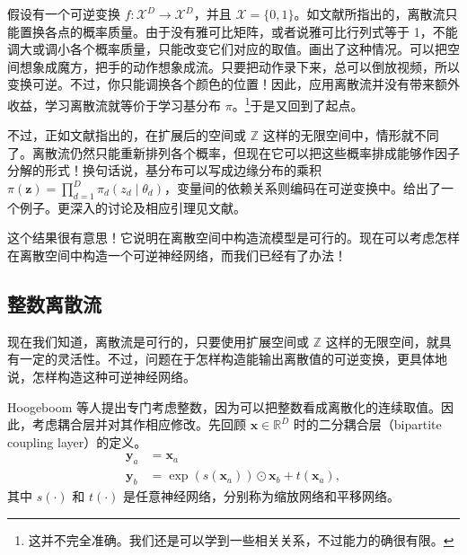 假设有一个可逆变换 $f\colon\mathcal{X}^D\to\mathcal{X}^D$，并且 $\mathcal{X}=\{0,1\}$。如文献所指出的，离散流只能置换各点的概率质量。由于没有雅可比矩阵，或者说雅可比行列式等于 1，不能调大或调小各个概率质量，只能改变它们对应的取值。画出了这种情况。可以把空间想象成魔方，把手的动作想象成流。只要把动作录下来，总可以倒放视频，所以变换可逆。不过，你只能调换各个颜色的位置！因此，应用离散流并没有带来额外收益，学习离散流就等价于学习基分布 $\pi$。\footnote{这并不完全准确。我们还是可以学到一些相关关系，不过能力的确很有限。}于是又回到了起点。

不过，正如文献指出的，在扩展后的空间或 $\mathbb{Z}$ 这样的无限空间中，情形就不同了。离散流仍然只能重新排列各个概率，但现在它可以把这些概率排成能够作因子分解的形式！换句话说，基分布可以写成边缘分布的乘积 $\pi(\mathbf{z})=\prod_{d=1}^D\pi_d(z_d\mid\theta_d)$，变量间的依赖关系则编码在可逆变换中。给出了一个例子。更深入的讨论及相应引理见文献。



这个结果很有意思！它说明在离散空间中构造流模型是可行的。现在可以考虑怎样在离散空间中构造一个可逆神经网络，而我们已经有了办法！

\subsection{整数离散流}

现在我们知道，离散流是可行的，只要使用扩展空间或 $\mathbb{Z}$ 这样的无限空间，就具有一定的灵活性。不过，问题在于怎样构造能输出离散值的可逆变换，更具体地说，怎样构造这种可逆神经网络。

Hoogeboom 等人提出专门考虑整数，因为可以把整数看成离散化的连续取值。因此，考虑耦合层并对其作相应修改。先回顾 $\mathbf{x}\in\mathbb{R}^D$ 时的二分耦合层（bipartite coupling layer）的定义。
\begin{align}
\mathbf{y}_a&=\mathbf{x}_a
\tag{4.33}\label{eq:04-33}\\
\mathbf{y}_b&=\exp(s(\mathbf{x}_a))\odot\mathbf{x}_b+t(\mathbf{x}_a),
\tag{4.34}\label{eq:04-34}
\end{align}
其中 $s(\cdot)$ 和 $t(\cdot)$ 是任意神经网络，分别称为缩放网络和平移网络。

